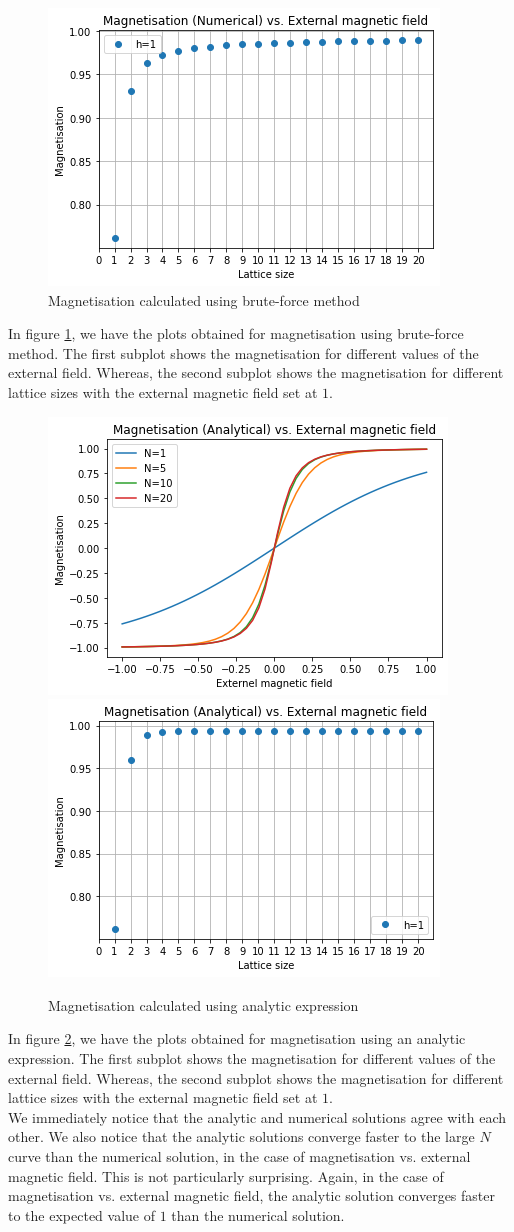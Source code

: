\documentclass{article}
\begin{document}
\begin{enumerate}
\begin{figure}[h!]
    \includegraphics[width=.45\textwidth]{mn-numerical.png}\hfill
    \caption{Magnetisation calculated using brute-force method}
    \label{fig:numerical}
\end{figure}
    In figure \ref{fig:numerical}, we have the plots obtained for magnetisation using brute-force method. The first subplot shows the magnetisation for different values of the external field. Whereas, the second subplot shows the magnetisation for different lattice sizes with the external magnetic field set at $1$.\\
\begin{figure}[h!]
    \includegraphics[width=.45\textwidth]{mh-analytic.png}\hfill
    \includegraphics[width=.45\textwidth]{mn-analytic.png}\hfill
    \caption{Magnetisation calculated using analytic expression}
    \label{fig:analytic}
\end{figure}
    In figure \ref{fig:analytic}, we have the plots obtained for magnetisation using an analytic expression. The first subplot shows the magnetisation for different values of the external field. Whereas, the second subplot shows the magnetisation for different lattice sizes with the external magnetic field set at $1$.\\
    We immediately notice that the analytic and numerical solutions agree with each other. We also notice that the analytic solutions converge faster to the large $N$ curve than the numerical solution, in the case of magnetisation vs. external magnetic field. This is not particularly surprising. Again, in the case of magnetisation vs. external magnetic field, the analytic solution converges faster to the expected value of $1$ than the numerical solution.\\

\end{enumerate}
\end{document}
